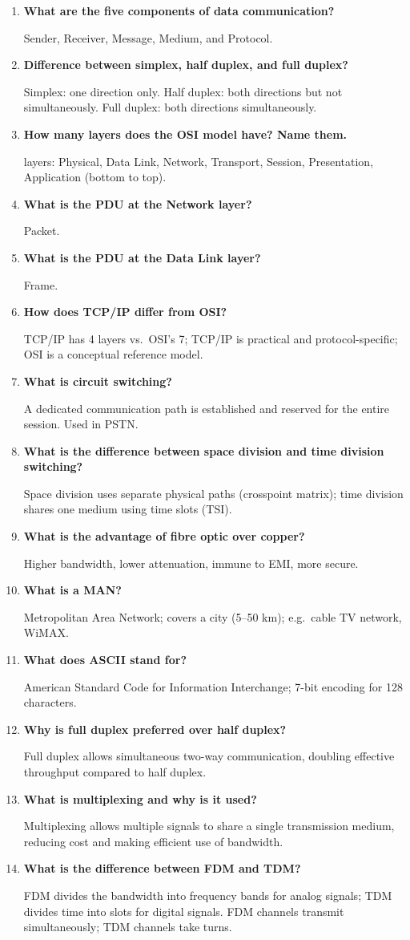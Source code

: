 \documentclass[12pt,a4paper]{article}
\newcommand{\Q}[1]{\textbf{#1}\par\noindent\ignorespaces}
\begin{document}
\begin{tcolorbox}[exambox, title={\textbf{Frequently Asked / Viva Questions}}]
\begin{enumerate}[leftmargin=*, topsep=0pt, label=\textbf{Q\arabic*.}, itemsep=8pt]
  \item \Q{What are the five components of data communication?} Sender, Receiver, Message, Medium, and Protocol.
  \item \Q{Difference between simplex, half duplex, and full duplex?} Simplex: one direction only. Half duplex: both directions but not simultaneously. Full duplex: both directions simultaneously.
  \item \Q{How many layers does the OSI model have? Name them.} 7 layers: Physical, Data Link, Network, Transport, Session, Presentation, Application (bottom to top).
  \item \Q{What is the PDU at the Network layer?} Packet.
  \item \Q{What is the PDU at the Data Link layer?} Frame.
  \item \Q{How does TCP/IP differ from OSI?} TCP/IP has 4 layers vs.\ OSI's 7; TCP/IP is practical and protocol-specific; OSI is a conceptual reference model.
  \item \Q{What is circuit switching?} A dedicated communication path is established and reserved for the entire session. Used in PSTN.
  \item \Q{What is the difference between space division and time division switching?} Space division uses separate physical paths (crosspoint matrix); time division shares one medium using time slots (TSI).
  \item \Q{What is the advantage of fibre optic over copper?} Higher bandwidth, lower attenuation, immune to EMI, more secure.
  \item \Q{What is a MAN?} Metropolitan Area Network; covers a city (5--50 km); e.g.\ cable TV network, WiMAX.
  \item \Q{What does ASCII stand for?} American Standard Code for Information Interchange; 7-bit encoding for 128 characters.
  \item \Q{Why is full duplex preferred over half duplex?} Full duplex allows simultaneous two-way communication, doubling effective throughput compared to half duplex.
  \item \Q{What is multiplexing and why is it used?} Multiplexing allows multiple signals to share a single transmission medium, reducing cost and making efficient use of bandwidth.
  \item \Q{What is the difference between FDM and TDM?} FDM divides the bandwidth into frequency bands for analog signals; TDM divides time into slots for digital signals. FDM channels transmit simultaneously; TDM channels take turns.

\end{enumerate}
\end{tcolorbox}
\end{document}

